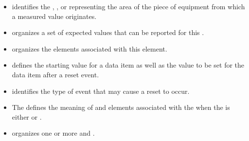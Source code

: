 \begin{itemize}

\item {} \newline {} identifies the , , or  representing the area of the piece of equipment from which a measured value originates.

\item {} \newline {} \glspl{organize} a set of expected values that can be reported for this .

\item {} \newline {} \glspl{organize} the  elements associated with this  element. 

\item {} \newline {} defines the starting value for a data item as well as the value to be set for the data item after a reset event.

\item {} \newline {} identifies the type of event that may cause a reset to occur.

\item {} \newline The  defines the meaning of  and  elements associated with the  when the  is either  or .

\item {} \newline {} \glspl{organize} one or more  and .
\end{itemize}


